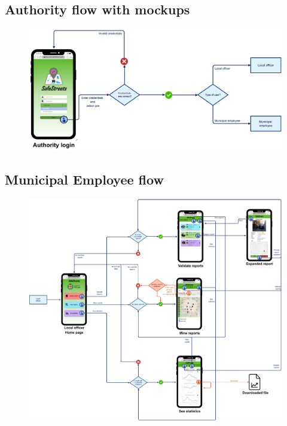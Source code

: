 			\subsection{Authority flow with mockups}
			\begin{figure}[!h]
				\centering
				\includegraphics[width=\textwidth]{images/Flow/AuthorityFlow}
			\end{figure}
			\clearpage
			\subsection{Municipal Employee flow}
			\begin{figure}[!h]
				\centering
				\includegraphics[width=\textwidth]{images/Flow/MEFlow}
			\end{figure}
			\clearpage
